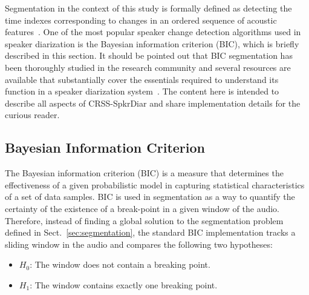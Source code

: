 Segmentation in the context of this study is formally defined as detecting the time indexes corresponding to changes in an ordered sequence of acoustic features~\cite{cettolo2005evaluation}. 
One of the most popular speaker change detection algorithms used in speaker diarization is the Bayesian information criterion (BIC), which is briefly described in this section. 
It should be pointed out that BIC segmentation has been thoroughly studied in the research community and several resources are available that substantially cover the essentials required to understand its function in a speaker diarization system~\cite{cettolo2003efficient,cettolo2005evaluation,chen1998BIC,zhou2005T2bic}. 
The content here is intended to describe all aspects of CRSS-SpkrDiar and share implementation details for the curious reader. 

\subsection{Bayesian Information Criterion}
\label{ssec:chDiar_secBIC}
The Bayesian information criterion (BIC) is a measure that determines the effectiveness of a given probabilistic model in capturing statistical characteristics of a set of data samples. 
BIC is used in segmentation as a way to quantify the certainty of the existence of a break-point in a given window of the audio. 
Therefore, instead of finding a global solution to the segmentation problem defined in Sect.~\ref{sec:segmentation}, the standard BIC implementation tracks a sliding window in the audio and compares the following two hypotheses: 
\begin{itemize}
	\item $H_0$: The window does not contain a breaking point. 
	\item $H_1$: The window contains exactly one breaking point. 
\end{itemize}

